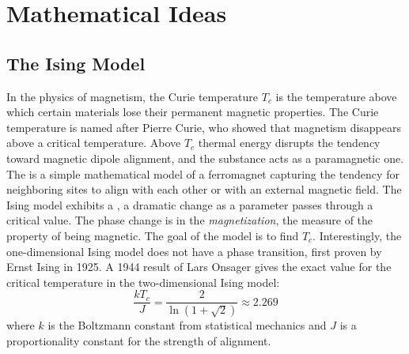 \documentclass[12pt]{article}
\begin{document}
\hr

\section*{Mathematical Ideas}
\subsection*{The Ising Model}

In the physics of magnetism, the Curie temperature \( T_c \)%
is the temperature above which certain materials lose their permanent
magnetic properties.  The Curie temperature is named after Pierre Curie,
who showed that magnetism disappears above a critical temperature. Above
\( T_c \) thermal energy disrupts the tendency toward magnetic dipole
alignment, and the substance acts as a paramagnetic one.  The %
is a simple mathematical model of a ferromagnet capturing the tendency
for neighboring sites to align with each other or with an external
magnetic field.  The Ising model exhibits a ,%
a dramatic change as a parameter passes through a critical value.  The
phase change is in the \emph{magnetization},%
the measure of the property of being magnetic.  The goal of the model is
to find \( T_c \).  Interestingly, the one-dimensional Ising model does
not have a phase transition, first proven by Ernst Ising in 1925.  A
1944 result of Lars Onsager gives the exact value for the critical
temperature in the two-dimensional Ising model:
\[
    \frac{kT_c}{J} = \frac{2}{\ln(1 + \sqrt{2})} \approx 2.269
\] where \( k \) is the Boltzmann constant from statistical mechanics
and \( J \) is a proportionality constant for the strength of alignment.
\end{document}

